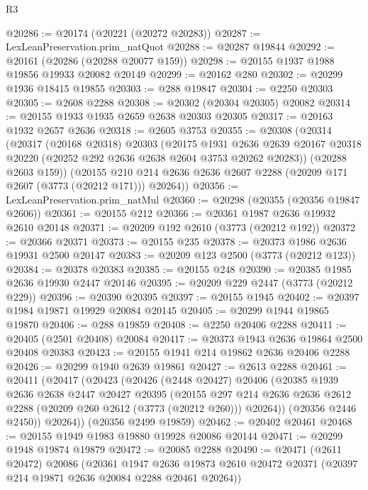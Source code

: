 \begin{lexlean}{R3}
\begin{coremodule}
@20286 := @20174 (@20221 (@20272 @20283))
@20287 := LexLeanPreservation.prim_natQuot
@20288 := @20287 @19844
@20292 := @20161 (@20286 (@20288 @20077 @159))
@20298 := @20155 @1937 @1988 @19856 @19933 @20082 @20149
@20299 := @20162 @280
@20302 := @20299 @1936 @18415 @19855
@20303 := @288 @19847
@20304 := @2250 @20303
@20305 := @2608 @2288
@20308 := @20302 (@20304 @20305) @20082
@20314 := @20155 @1933 @1935 @2659 @2638 @20303 @20305
@20317 := @20163 @1932 @2657 @2636
@20318 := @2605 @3753
@20355 := @20308
    (@20314
      (@20317
        (@20168 @20318)
        @20303
        (@20175
          @1931
          @2636
          @2639
          @20167
          @20318
          @20220
          (@20252 @292 @2636 @2638 @2604 @3753 @20262 @20283))
        (@20288 @2603 @159))
      (@20155 @210 @214 @2636 @2636 @2607 @2288 (@20209 @171 @2607 (@3773 (@20212 @171))) @20264))
@20356 := LexLeanPreservation.prim_natMul
@20360 := @20298 (@20355 (@20356 @19847 @2606))
@20361 := @20155 @212
@20366 := @20361 @1987 @2636 @19932 @2610 @20148
@20371 := @20209 @192 @2610 (@3773 (@20212 @192))
@20372 := @20366 @20371
@20373 := @20155 @235
@20378 := @20373 @1986 @2636 @19931 @2500 @20147
@20383 := @20209 @123 @2500 (@3773 (@20212 @123))
@20384 := @20378 @20383
@20385 := @20155 @248
@20390 := @20385 @1985 @2636 @19930 @2447 @20146
@20395 := @20209 @229 @2447 (@3773 (@20212 @229))
@20396 := @20390 @20395
@20397 := @20155 @1945
@20402 := @20397 @1984 @19871 @19929 @20084 @20145
@20405 := @20299 @1944 @19865 @19870
@20406 := @288 @19859
@20408 := @2250 @20406 @2288
@20411 := @20405 (@2501 @20408) @20084
@20417 := @20373 @1943 @2636 @19864 @2500 @20408 @20383
@20423 := @20155 @1941 @214 @19862 @2636 @20406 @2288
@20426 := @20299 @1940 @2639 @19861
@20427 := @2613 @2288
@20461 := @20411
    (@20417
      (@20423
        (@20426
          (@2448 @20427)
          @20406
          (@20385
            @1939
            @2636
            @2638
            @2447
            @20427
            @20395
            (@20155
              @297
              @214
              @2636
              @2636
              @2612
              @2288
              (@20209 @260 @2612 (@3773 (@20212 @260)))
              @20264))
          (@20356 @2446 @2450))
        @20264))
    (@20356 @2499 @19859)
@20462 := @20402 @20461
@20468 := @20155 @1949 @1983 @19880 @19928 @20086 @20144
@20471 := @20299 @1948 @19874 @19879
@20472 := @20085 @2288
@20490 := @20471
    (@2611 @20472)
    @20086
    (@20361
      @1947
      @2636
      @19873
      @2610
      @20472
      @20371
      (@20397 @214 @19871 @2636 @20084 @2288 @20461 @20264))

\end{coremodule}
\end{lexlean}
